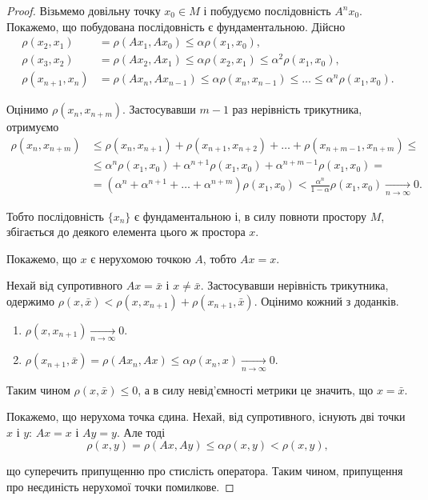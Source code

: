 \begin{proof}
	Візьмемо довільну точку $x_0\in M$ і побудуємо послідовність $A^nx_0$. Покажемо, що побудована послідовність є фундаментальною. Дійсно
	\begin{align*}
		\rho(x_2, x_1) &= \rho(A x_1, A x_0) \le \alpha \rho (x_1, x_0), \\
		\rho(x_3, x_2) &= \rho(A x_2, A x_1) \le \alpha \rho (x_2, x_1) \le \alpha^2 \rho(x_1, x_0), \\
		\rho(x_{n+1}, x_n) &= \rho(A x_n, A x_{n-1}) \le \alpha \rho (x_n, x_{n-1}) \le \ldots \le \alpha^n \rho(x_1, x_0).
	\end{align*}

	Оцінимо $\rho(x_n, x_{n+m})$. Застосувавши $m-1$ раз нерівність трикутника, отримуємо 
	\begin{align*}
		\rho(x_n, x_{n+m}) &\le \rho(x_n, x_{n+1}) + \rho(x_{n+1}, x_{n+2}) + \ldots + \rho(x_{n+m-1},x_{n+m}) \le \\
		&\le \alpha^n \rho(x_1, x_0) + \alpha^{n+1} \rho(x_1, x_0) +\alpha^{n+m-1} \rho(x_1, x_0) = \\
		&= (\alpha^n + \alpha^{n+1} + \ldots + \alpha^{n + m}) \rho(x_1, x_0) < \frac{\alpha^n}{1 - \alpha} \rho(x_1, x_0) \xrightarrow[n\to\infty]{} 0.
	\end{align*}
	
	Тобто послідовність $\{x_n\}$ є фундаментальною і, в силу повноти простору $M$, збігається до деякого елемента цього ж простора $x$. \parvskip

	Покажемо, що $x$ є нерухомою точкою $A$, тобто $Ax=x$.\parvskip

	Нехай від супротивного $Ax=\bar x$ і $x\ne\bar x$. Застосувавши нерівність трикутника, одержимо $\rho(x,\bar x) < \rho(x, x_{n+1}) + \rho(x_{n+1}, \bar x)$. Оцінимо кожний з доданків.
	\begin{enumerate}
		\item $\rho(x, x_{n+1}) \xrightarrow[n\to\infty]{} 0$.
		\item $\rho(x_{n+1}, \bar x) = \rho(Ax_n, Ax) \le \alpha \rho(x_n, x) \xrightarrow[n\to\infty]{} 0$.
	\end{enumerate}
	
	Таким чином $\rho(x, \bar x) \le 0$, а в силу невід'ємності метрики це значить, що $x = \bar x$. \parvskip

	Покажемо, що нерухома точка єдина. Нехай, від супротивного, існують дві точки $x$ і $y$: $A x = x$ і $A y = y$. Але тоді
	\begin{equation*}
		\rho(x, y) = \rho(A x, A y) \le \alpha \rho(x, y) < \rho(x, y),
	\end{equation*}
	
	що суперечить припущенню про стислість оператора. Таким чином, припущення про неєдиність нерухомої точки помилкове.
\end{proof}

